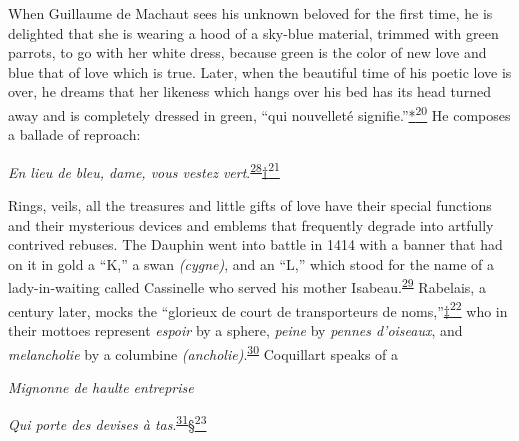 When Guillaume de Machaut sees his unknown beloved for the first time,
he is delighted that she is wearing a hood of a sky-blue material,
trimmed with green parrots, to go with her white dress, because green is
the color of new love and blue that of love which is true. Later, when
the beautiful time of his poetic love is over, he dreams that her
likeness which hangs over his bed has its head turned away and is
completely dressed in green, ``qui nouvelleté
signifie.''\protect\hypertarget{11_Chapter_Four__THE_FORMS_OF_LOVE.xhtmlux5cux23id_3139}{\protect\hyperlink{23_NOTES.xhtmlux5cux23id_3140}{*\textsuperscript{20}}}
He composes a ballade of reproach:

\emph{En lieu de bleu, dame, vous vestez
vert}.\textsuperscript{\protect\hypertarget{11_Chapter_Four__THE_FORMS_OF_LOVE.xhtmlux5cux23id_1433}{\protect\hyperlink{23_NOTES.xhtmlux5cux23id_1434}{28}}}\protect\hypertarget{11_Chapter_Four__THE_FORMS_OF_LOVE.xhtmlux5cux23id_3141}{\protect\hyperlink{23_NOTES.xhtmlux5cux23id_3142}{†\textsuperscript{21}}}

Rings, veils, all the treasures and little gifts of love have their
special functions and their mysterious devices and emblems that
frequently degrade into artfully contrived rebuses. The Dauphin went
into battle in 1414 with a banner that had on it in gold a ``K,'' a swan
\emph{(cygne)}, and an ``L,'' which stood for the name of a
lady-in-waiting called Cassinelle who served his mother
Isabeau.\textsuperscript{\protect\hypertarget{11_Chapter_Four__THE_FORMS_OF_LOVE.xhtmlux5cux23id_1431}{\protect\hyperlink{23_NOTES.xhtmlux5cux23id_1432}{29}}}
Rabelais, a century later, mocks the ``glorieux de court de
transporteurs de
noms,''\protect\hypertarget{11_Chapter_Four__THE_FORMS_OF_LOVE.xhtmlux5cux23id_3143}{\protect\hyperlink{23_NOTES.xhtmlux5cux23id_3144}{‡\textsuperscript{22}}}
who in their mottoes represent \emph{espoir} by a sphere, \emph{peine}
by \emph{pennes d'oiseaux}, and \emph{melancholie} by a columbine
\emph{(ancholie)}.\textsuperscript{\protect\hypertarget{11_Chapter_Four__THE_FORMS_OF_LOVE.xhtmlux5cux23id_1429}{\protect\hyperlink{23_NOTES.xhtmlux5cux23id_1430}{30}}}
Coquillart speaks of a

\emph{Mignonne de haulte entreprise}

\emph{Qui porte des devises à
tas}.\textsuperscript{\protect\hypertarget{11_Chapter_Four__THE_FORMS_OF_LOVE.xhtmlux5cux23id_1427}{\protect\hyperlink{23_NOTES.xhtmlux5cux23id_1428}{31}}}\protect\hypertarget{11_Chapter_Four__THE_FORMS_OF_LOVE.xhtmlux5cux23id_3145}{\protect\hyperlink{23_NOTES.xhtmlux5cux23id_3146}{§\textsuperscript{23}}}


